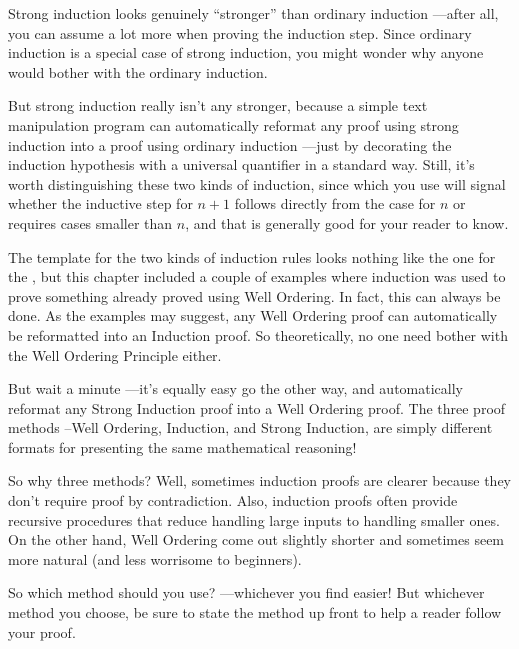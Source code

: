 Strong induction looks genuinely ``stronger'' than ordinary induction
---after all, you can assume a lot more when proving the induction step.
Since ordinary induction is a special case of strong induction, you might
wonder why anyone would bother with the ordinary induction.

But strong induction really isn't any stronger, because a simple text
manipulation program can automatically reformat any proof using strong
induction into a proof using ordinary induction ---just by decorating the
induction hypothesis with a universal quantifier in a standard way.
Still, it's worth distinguishing these two kinds of induction, since which
you use will signal whether the inductive step for $n+1$ follows directly
from the case for $n$ or requires cases smaller than $n$, and that is
generally good for your reader to know.

The template for the two kinds of induction rules looks nothing like
the one for the , but this chapter
included a couple of examples where induction was used to prove
something already proved using Well Ordering.  In fact, this can
always be done.  As the examples may suggest, any Well Ordering proof
can automatically be reformatted into an Induction proof.  So
theoretically, no one need bother with the Well Ordering Principle
either.

But wait a minute ---it's equally easy go the other way, and automatically
reformat any Strong Induction proof into a Well Ordering proof.   The
three proof methods --Well Ordering, Induction, and Strong Induction, are
simply different formats for presenting the same mathematical reasoning!

So why three methods?  Well, sometimes induction proofs are clearer
because they don't require proof by contradiction.  Also, induction proofs
often provide recursive procedures that reduce handling large inputs to
handling smaller ones.  On the other hand, Well Ordering come out slightly
shorter and sometimes seem more natural (and less worrisome to beginners).

So which method should you use? ---whichever you find easier!  But
whichever method you choose, be sure to state the method up front to
help a reader follow your proof.

